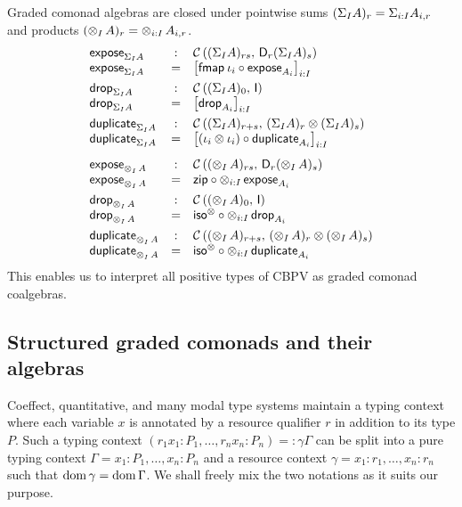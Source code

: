 \documentclass[acmsmall,review,anonymous]{acmart}\settopmatter{printfolios=true,printccs=false,printacmref=false}
\theoremstyle{remark}
\begin{document}
Graded comonad algebras are closed under pointwise sums $(\sumt I A)_r = \sumt {i:I} {A_{i,r}}$ and products $(\tupt I A)_r = \tupt {i:I} {A_{i,r}}$.
\[
\begin{array}{lcl}
  \expose[\sumt I A] & : & \Hom {(\sumt I A)_{rs}} {\D[r](\sumt I A)_s} \\
  \expose[\sumt I A] & = & \left[  \fmap{\iota_i} \comp \expose[A_i] \right]_{i:I}
\\[1ex]
  \tdrop[\sumt I A] & : & \Hom {(\sumt I A)_0} \I \\
  \tdrop[\sumt I A] & = & \left[ \tdrop[A_i] \right]_{i:I}
\\[1ex]
  \duplicate[\sumt I A] & : & \Hom {(\sumt I A)_{r+s}} {(\sumt I A)_r \otimes (\sumt I A)_s} \\
  \duplicate[\sumt I A] & = & \left[ (\iota_i \otimes \iota_i) \comp \duplicate[A_i] \right]_{i:I}
\\[2ex]
  \expose[\tupt I A] & : & \Hom {(\tupt I A)_{rs}} {\D[r](\tupt I A)_s} \\
  \expose[\tupt I A] & = & \tzip \comp \tupt {i:I} {\expose[A_i]}
\\[1ex]
  \tdrop[\tupt I A] & : & \Hom {(\tupt I A)_0} \I \\
  \tdrop[\tupt I A] & = & \isot \comp \tupt {i:I} {\tdrop[A_i]}
\\[1ex]
  \duplicate[\tupt I A] & : & \Hom {(\tupt I A)_{r+s}} {(\tupt I A)_r \otimes (\tupt I A)_s} \\
  \duplicate[\tupt I A] & = & \isot \comp \tupt {i:I} {\duplicate[A_i]}
\end{array}
\]
This enables us to interpret all positive types of CBPV as graded
comonad coalgebras.


\subsection{Structured graded comonads and their algebras}

Coeffect, quantitative, and many modal type systems maintain a typing
context where each variable $x$ is annotated by a resource qualifier
$r$ in addition to its type $P$.  Such a typing context
$(r_1x_1{:}P_1, \dots, r_nx_n{:}P_n) =: \gamma\Gamma$ can be
split into a pure typing context
$\Gamma = x_1{:}P_1, \dots, x_n{:}P_n$ and a resource context
$\gamma = x_1{:}r_1, \dots, x_n{:}r_n$ such that
$\dom \gamma = \dom \Gamma$.  We shall freely mix the two notations as
it suits our purpose.
\end{document}
